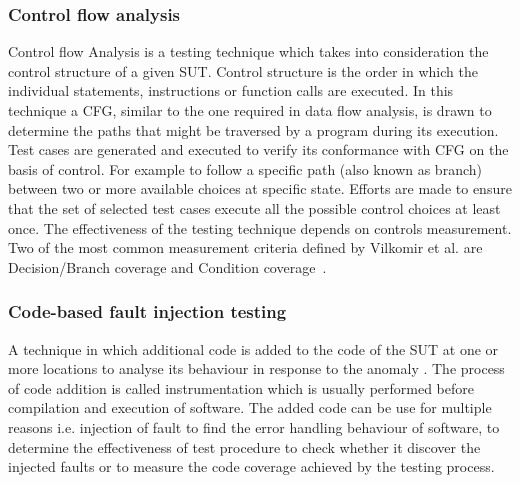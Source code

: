 \subsubsection{Control flow analysis}
Control flow Analysis is a testing technique which takes into consideration the control structure of a given SUT. Control structure is the order in which the individual statements, instructions or function calls are executed. In this technique a CFG, similar to the one required in data flow analysis, is drawn to determine the paths that might be traversed by a program during its execution. Test cases are generated and executed to verify its conformance with CFG on the basis of control. For example to follow a specific path (also known as branch) between two or more available choices at specific state. Efforts are made to ensure that the set of selected test cases execute all the possible control choices at least once. The effectiveness of the testing technique depends on controls measurement. Two of the most common measurement criteria defined by Vilkomir et al. are Decision/Branch coverage and Condition coverage~\cite{vilkomir2003tolerance}. 

\subsubsection{Code-based fault injection testing}
A technique in which additional code is added to the code of the SUT at one or more locations to analyse its behaviour in response to the anomaly \cite{voas1997software}. The process of code addition is called instrumentation which is usually performed before compilation and execution of software. The added code can be use for multiple reasons i.e. injection of fault to find the error handling behaviour of software, to determine the effectiveness of test procedure to check whether it discover the injected faults or to measure the code coverage achieved by the testing process.    

